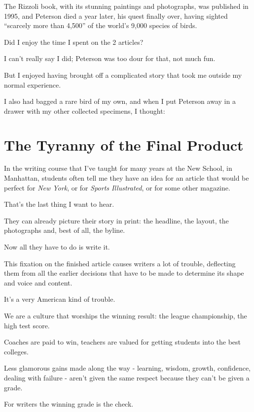 \documentclass{book}
\numberwithin{equation}{section}
\begin{document}
%
The Rizzoli book, with its stunning paintings and photographs, was published in 1995, and Peterson died a year later, his quest finally over, having sighted ``scarcely more than 4,500'' of the world's 9,000 species of birds.

Did I enjoy the time I spent on the 2 articles?

I can't really say I did; Peterson was too dour for that, not much fun.

But I enjoyed having brought off a complicated story that took me outside my normal experience.

I also had bagged a rare bird of my own, and when I put Peterson away in a drawer with my other collected specimens, I thought: 


\chapter{The Tyranny of the Final Product}

In the writing course that I've taught for many years at the New School, in Manhattan, students often tell me they have an idea for an article that would be perfect for \textit{New York}, or for \textit{Sports Illustrated}, or for some other magazine.

That's the last thing I want to hear.

They can already picture their story in print: the headline, the layout, the photographs and, best of all, the byline.

Now all they have to do is write it.

%
This fixation on the finished article causes writers a lot of trouble, deflecting them from all the earlier decisions that have to be made to determine its shape and voice and content.

It's a very American kind of trouble.

We are a culture that worships the winning result: the league championship, the high test score.

Coaches are paid to win, teachers are valued for getting students into the best colleges.

Less glamorous gains made along the way - learning, wisdom, growth, confidence, dealing with failure - aren't given the same respect because they can't be given a grade.

%
For writers the winning grade is the check.
\end{document}
